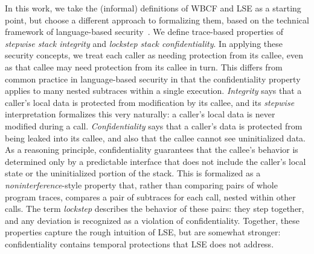 \documentclass[acmsmall,review,anonymous]{acmart}\settopmatter{printfolios=true,printccs=false,printacmref=false}
\begin{document}
In this work, we take the (informal) definitions of WBCF  and LSE as a starting
point, but choose a different approach to formalizing them, based on the
technical framework of language-based security~\citep{??}. We define
trace-based properties of \emph{stepwise stack integrity} and
\emph{lockstep stack confidentiality}.
In applying these security concepts, we treat each caller as needing protection
from its callee, even as that callee may need protection from its callee in turn.
This differs from common practice in language-based security in that the
confidentiality property applies to many nested subtraces within a single execution.
 
{\em Integrity} says that a caller's local data is protected from modification by its callee,
and its {\em stepwise} interpretation formalizes this very naturally: a caller's local data
is never modified during a call. {\em Confidentiality} says that a caller's data is protected
from being leaked into its callee, and also that the callee cannot see uninitialized data.
As a reasoning principle, confidentiality guarantees that the callee's
behavior is determined only by a predictable interface that does not include the caller's
local state or the uninitialized portion of the stack. This is formalized as a
{\em noninterference}-style property that, rather than comparing pairs of whole program traces,
compares a pair of subtraces for each call, nested within other calls. The term
{\em lockstep} describes the behavior of these pairs: they step together, and any
deviation is recognized as a violation of confidentiality.
Together, these properties capture the rough intuition of LSE, but are somewhat stronger:
confidentiality contains temporal protections that LSE does not address.
\end{document}
